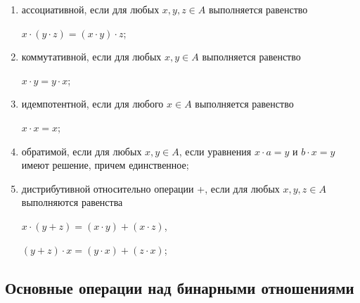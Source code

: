 \documentclass[spec, och, labwork]{shiza}
\begin{document}
    \begin{enumerate}
        \item ассоциативной, если для любых $x, y, z \in A$ выполняется равенство
        
        \begin{center}
            $x \cdot (y \cdot z) = (x \cdot y) \cdot z$;
        \end{center}

        \item коммутативной, если для любых $x, y \in A$ выполняется равенство
        
        \begin{center}
            $x \cdot y = y \cdot x$;
        \end{center}

        \item идемпотентной, если для любого $x \in A$ выполняется равенство
        
        \begin{center}
            $x \cdot x = x$;
        \end{center}

        \item обратимой, если для любых $x, y \in A$, если уравнения $x \cdot a = y$ и $b \cdot x = y$  имеют решение, причем единственное;
        \item дистрибутивной относительно операции +, если для любых $x, y, z \in A$ выполняются равенства
        
        \begin{center}
            $x \cdot (y + z) = (x \cdot y) + (x \cdot z)$,

            $(y + z) \cdot x = (y \cdot x) + (z \cdot x)$;
        \end{center}
    \end{enumerate}

    \subsection{Основные операции над бинарными отношениями}
\end{document}
